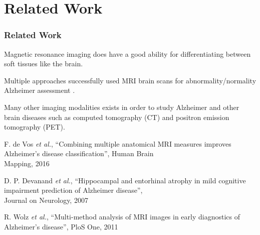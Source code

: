\section{Related Work}

\begin{frame}
	\frametitle{Related Work}
	
	\Large
	
	\vspace{0.6cm}
	
	Magnetic resonance imaging does have a good ability for differentiating between soft tissues like
	the brain.
	
	\vspace{0.2cm}
	
	Multiple approaches successfully used MRI brain scans for abnormality/normality Alzheimer
	assessment \cite{DeVos16,Devanand07,Wolz11}.
	
	\vspace{0.2cm}
	
	Many other imaging modalities exists in order to study Alzheimer and other brain diseases such as
	computed tomography (CT) and positron emission tomography (PET).
	
	\vspace{0.2cm}
	
	\tiny
	
	\cite{DeVos16} F. de Vos \emph{et al.}, ``Combining multiple anatomical MRI measures improves
	Alzheimer's disease classification'', Human Brain\\ \hspace{0.25cm} Mapping, 2016
	
	\cite{Devanand07} D. P. Devanand \emph{et al.}, ``Hippocampal and entorhinal atrophy in mild
	cognitive impairment prediction of Alzheimer disease'',\\ \hspace{0.25cm} Journal on Neurology, 2007
	
	\cite{Wolz11} R. Wolz \emph{et al.}, ``Multi-method analysis of MRI images in early diagnostics of
	Alzheimer's disease'', PloS One, 2011
\end{frame}

